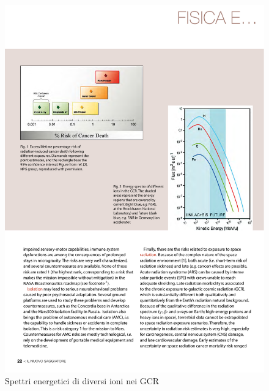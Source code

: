 \documentclass[9pt]{beamer}
\begin{document}
\begin{frame} [fragile]
\begin{columns}
\begin{column}{0.50\textwidth}
\begin{figure}
			\includegraphics[scale=.55]{figures/sagg1.pdf}
			\caption{Spettri energetici di diversi ioni nei GCR \cite{saggiatore}}
		\end{figure}
    \end{column}
\end{columns}
\end{frame}
	
\end{document}
